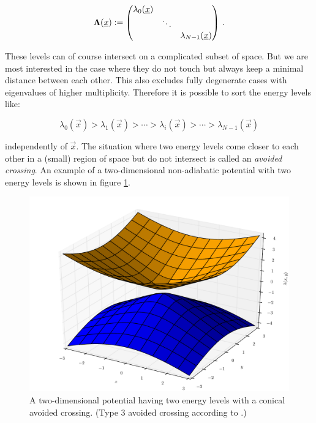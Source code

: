 \begin{equation} \label{eq:eigenlevels_matrix}
  \mathbf{\Lambda}(\underline{x}) :=
  \begin{pmatrix}
    \lambda_0(\underline{x}) & {}     & {} \\
    {}                 & \ddots & {} \\
    {}                 & {}     & \lambda_{N-1}(\underline{x})
  \end{pmatrix} \,.
\end{equation}

These levels can of course intersect on a complicated subset of space. But
we are most interested in the case where they do not touch but always keep a
minimal distance between each other. This also excludes fully degenerate cases
with eigenvalues of higher multiplicity. Therefore it is possible to sort
the energy levels like:

\begin{equation}
  \lambda_0(\vec{x}) > \lambda_1(\vec{x}) > \cdots > \lambda_i(\vec{x}) > \cdots > \lambda_{N-1}(\vec{x})
\end{equation}

independently of $\vec{x}$. The situation where two energy levels come closer
to each other in a (small) region of space but do not intersect is called an
\emph{avoided crossing}. An example of a two-dimensional non-adiabatic potential
with two energy levels is shown in figure \ref{fig:conic_avoided}.

\begin{figure}
  \centering
  \includegraphics[width=0.7\linewidth]{./fig/conic_avoided.pdf}
  \caption[Example of an avoided crossing]
          {A two-dimensional potential having two energy levels with a conical
           avoided crossing. (Type 3 avoided crossing according to \cite{HJ_molecularpropagation}.)}
  \label{fig:conic_avoided}
\end{figure}

